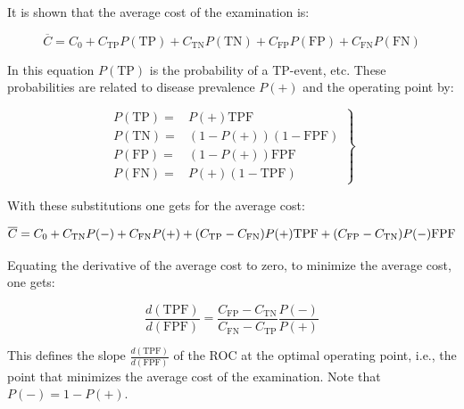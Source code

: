 \documentclass[
]{book}
\begin{document}
It is shown \citep{metz1978rocmethodology} that the average cost of the examination is:

\begin{equation} 
\overline{C} = C_0 + C_{\text{TP}} P(\text{TP}) 
+ C_{\text{TN}} P(\text{TN})
+ C_{\text{FP}} P(\text{FP})
+ C_{\text{FN}} P(\text{FN})
\label{eq:binormal-model-cost}
\end{equation}

In this equation \(P(\text{TP})\) is the probability of a TP-event, etc. These probabilities are related to disease prevalence \(P(+)\) and the operating point by:

\begin{equation} 
\left.
\begin{aligned}
P(\text{TP}) =& P(+) \text{TPF} \\
P(\text{TN}) =& (1-P(+)) (1-\text{FPF}) \\
P(\text{FP}) =& (1-P(+)) \text{FPF} \\
P(\text{FN}) =& P(+) (1-\text{TPF}) 
\end{aligned}
\right \}
\label{eq:binormal-model-cost2}
\end{equation}

With these substitutions one gets for the average cost:

\begin{equation} 
\overline{C} = C_0 + C_{\text{TN}} P(-) + C_{\text{FN}}  P(+) \\
+ (C_{\text{TP}} - C_{\text{FN}}) P(+) \text{TPF} \\
+ (C_{\text{FP}} - C_{\text{TN}}) P(-) \text{FPF} \\
\label{eq:binormal-model-cost3}
\end{equation}

Equating the derivative of the average cost to zero, to minimize the average cost, one gets:

\begin{equation} 
\frac{d(\text{TPF})}{d(\text{FPF})} = \frac{C_{\text{FP}} - C_{\text{TN}}}{C_{\text{FN}} - C_{\text{TP}}}\frac{P(-)}{P(+)}
\label{eq:binormal-model-cost4}
\end{equation}

This defines the slope \(\frac{d(\text{TPF})}{d(\text{FPF})}\) of the ROC at the optimal operating point, i.e., the point that minimizes the average cost of the examination. Note that \(P(-) = 1 - P(+)\).
\end{document}
